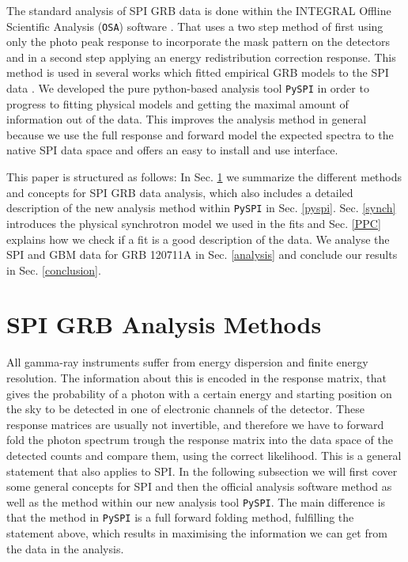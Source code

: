 \documentclass[twocolumn]{aa}
\begin{document}
The standard analysis of SPI GRB data is done within the INTEGRAL Offline Scientific Analysis ({\tt OSA}) software \citep{osa}. That uses a two step method of first using only the photo peak response to incorporate the mask pattern on the detectors and in a second step applying an energy redistribution correction response. This method is used in several works which fitted empirical GRB models to the SPI data \citep[e.g.][]{spi_grb1, spi_grb2}.
We developed the pure python-based analysis tool {\tt PySPI} in order to progress to fitting physical models and getting the maximal amount of information out of the data. This improves the analysis method in general because we use the full response and forward model the expected spectra to the native SPI data space and offers an easy to install and use interface.

This paper is structured as follows: In Sec. \ref{methods} we summarize the different methods and concepts for SPI GRB data analysis, which also includes a detailed description of the new analysis method within {\tt PySPI} in Sec. \ref{pyspi}. Sec. \ref{synch} introduces the physical synchrotron model we used in the fits and Sec. \ref{PPC} explains how we check if a fit is a good description of the data. We analyse the SPI and GBM data for GRB 120711A in Sec. \ref{analysis} and conclude our results in Sec. \ref{conclusion}.
\section{SPI GRB Analysis Methods}
\label{methods}
All gamma-ray instruments suffer from energy dispersion and finite energy resolution. The information about this is encoded in the response matrix, that gives the probability of a photon with a certain energy and starting position on the sky to be detected in one of electronic channels of the detector. These response matrices are usually not invertible, and therefore we have to forward fold the photon spectrum trough the response matrix into the data space of the detected counts and compare them, using the correct likelihood. This is a general statement that also applies to SPI. In the following subsection we will first cover some general concepts for SPI and then the official analysis software method as well as the method within our new analysis tool {\tt PySPI}. The main difference is that the method in {\tt PySPI} is a full forward folding method, fulfilling the statement above, which results in maximising the information we can get from the data in the analysis.
\end{document}
